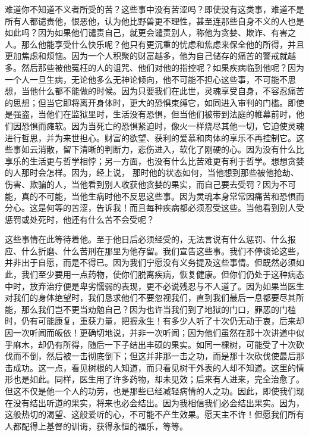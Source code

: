难道你不知道不义者所受的苦？这些事中没有苦涩吗？即使没有这类事，难道不是所有人都谴责他，恨恶他，认为他比野兽更不理性，甚至连那些自身不义的人也是如此吗？因为如果他们谴责自己，就更会谴责别人，称他为贪婪、欺诈、有害之人。那么他能享受什么快乐呢？他只有更沉重的忧虑和焦虑来保全他的所得，并且更加焦虑和烦恼。因为一个人积聚的财富越多，他为自己储存的痛苦的警戒就越多。然后那些被他冤枉的人的诅咒、他们对他的指控呢？如果疾病临到他呢？因为一个人一旦生病，无论他多么无神论倾向，他不可能不担心这些事，不可能不思想，当他什么都不能做的时候。因为只要我们在此世，灵魂享受自身，不容忍痛苦的思想；但当它即将离开身体时，更大的恐惧束缚它，如同进入审判的门槛。即使是强盗，当他们在监狱里时，生活没有恐惧，但当他们被带到法庭的帷幕前时，他们因恐惧而瘫软。因为当死亡的恐惧紧迫时，像火一样烧尽其他一切，它迫使灵魂进行哲思，并为来世担心。财富的欲望、获利的爱慕和肉体的享乐不再控制它。这些事如云消散，留下清晰的判断力，悲伤进入，软化了刚硬的心。因为没有什么比享乐的生活更与哲学相悖；另一方面，也没有什么比苦难更有利于哲学。想想贪婪的人那时会怎样。因为，经上说，  那时他的状态如何，当他想到那些被他抢劫、伤害、欺骗的人，当他看到别人收获他贪婪的果实，而自己要去受罚？因为不可能，真的不可能，当他生病时他不反思这些事。因为灵魂本身常常因痛苦和恐惧而分心。这是何等的苦涩，告诉我！而且每种疾病都必须忍受这些。当他看到别人受惩罚或处死时，他还有什么苦不会受呢？\par

这些事情在此等待着他。至于他日后必须经受的，无法言说有什么惩罚、什么报应、什么折磨、什么苦刑在那里为他存留。我们宣告这些事。我们不停谈论这些，并非出于自愿，而是不得已。因为我们宁愿没有义务提及这些事情。但既然必须如此，我们至少要用一点药物，使你们脱离疾病，恢复健康。但你们仍处于这种病态中时，放弃治疗便是卑劣懦弱的表现，更不必说残忍与不人道了。因为如果当医生对我们的身体绝望时，我们恳求他们不要忽视我们，直到我们最后一息都要尽其所能，那么我们岂不更当劝勉自己？因为也许当我们到了地狱的门口，罪恶的门槛时，仍有可能康复，重获力量，把握永生！有多少人听了十次仍无动于衷，后来却因一次听闻而皈依！更确切地说，并非一次听闻；因为他们虽然在那十次讲道中似乎麻木，却仍有所得，随后一下子结出丰硕的果实。如同一棵树，可能受了十次砍伐而不倒，然后被一击彻底倒下；但这并非那一击之功，而是那十次砍伐使最后那击成功。这一点，看见树根的人知道，而只看见树干外表的人却不知道。这里的情形也是如此。同样，医生用了许多药物，却未见效；后来有人进来，完全治愈了。但这不仅是他一个人的功劳，也是那些已经减轻病情的人之功。因此，即使我们现在没有结出听道的果实，将来也必会结出。因为我相信我们必会结出果实。因为，这般热切的渴望、这般爱听的心，不可能不产生效果。愿天主不许！但愿我们所有人都配得上基督的训诲，获得永恒的福乐，等等。\par

